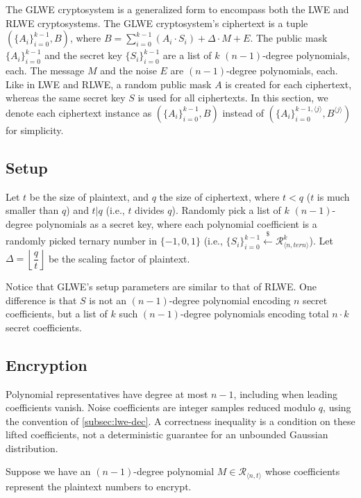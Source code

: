 The GLWE cryptosystem is a generalized form to encompass both the LWE and RLWE cryptosystems. The GLWE cryptosystem's ciphertext is a tuple $(\{A_i\}_{i=0}^{k-1}, B)$, where $B = \sum\limits_{i=0}^{k-1}{(A_i \cdot S_i)} + \Delta \cdot M + E$. The public mask $\{A_i\}_{i=0}^{k-1}$ and the secret key $\{S_i\}_{i=0}^{k-1}$ are a list of $k$ $(n-1)$-degree polynomials, each. The message $M$ and the noise $E$ are $(n-1)$-degree polynomials, each. Like in LWE and RLWE, a random public mask $A$ is created for each ciphertext, whereas the same secret key $S$ is used for all ciphertexts. In this section, we denote each ciphertext instance as $(\{A_i\}_{i=0}^{k-1}, B)$ instead of $(\{A_i\}_{i=0}^{k-1, \langle j \rangle}, B^{\langle j \rangle})$ for simplicity.




\subsection{Setup}
Let $t$ be the size of plaintext, and $q$ the size of ciphertext, where $t < q$ ($t$ is much smaller than $q$) and $t | q$ (i.e., $t$ divides $q$). Randomly pick a list of $k$ $(n-1)$-degree polynomials as a secret key, where each polynomial coefficient is a randomly picked ternary number in $\{-1, 0, 1\}$ (i.e., $\{S_i\}_{i=0}^{k-1} \xleftarrow{\$} \mathcal{R}_{\langle n, \textit{tern} \rangle}^k$). Let $\Delta = \left\lfloor\dfrac{q}{t}\right\rfloor$ be the scaling factor of plaintext.

Notice that GLWE's setup parameters are similar to that of RLWE. One difference is that $S$ is not an $(n-1)$-degree polynomial encoding $n$ secret coefficients, but a list of $k$ such $(n-1)$-degree polynomials encoding total $n \cdot k$ secret coefficients.


\subsection{Encryption}
\label{subsec:glwe-enc}

Polynomial representatives have degree at most $n-1$, including when leading coefficients vanish. Noise coefficients are integer samples reduced modulo $q$, using the convention of \autoref{subsec:lwe-dec}. A correctness inequality is a condition on these lifted coefficients, not a deterministic guarantee for an unbounded Gaussian distribution.

Suppose we have an $(n-1)$-degree polynomial $M \in \mathcal{R}_{\langle n, t \rangle}$ whose coefficients represent the plaintext numbers to encrypt.


